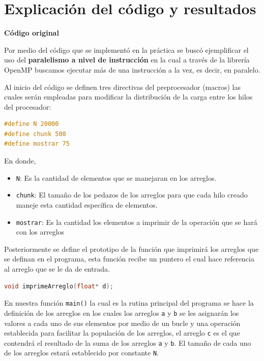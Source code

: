 \documentclass[12pt,a4paper]{article}
\begin{document}
\section{Explicación del código y resultados}

\textbf{Código original}

\vspace{1em}

Por medio del código que se implementó en la práctica se buscó ejemplificar el uso del \textbf{paralelismo a nivel de instrucción} en la cual a través de la librería OpenMP buscamos ejecutar más de una instrucción a la vez, es decir, en paralelo.

\vspace{1em}

Al inicio del código se definen tres directivas del preprocesador (macros) las cuales serán empleadas para modificar la distribución de la carga entre los hilos del procesador:

\begin{lstlisting}[language=C, numbers=none]
#define N 20000
#define chunk 500
#define mostrar 75
\end{lstlisting}
En donde,
\begin{itemize}
    \item \texttt{N}: Es la cantidad de elementos que se manejaran en los arreglos.
    \item \texttt{chunk}: El tamaño de los pedazos de los arreglos para que cada hilo creado maneje esta cantidad específica de elementos.
    \item \texttt{mostrar}: Es la cantidad los elementos a imprimir de la operación que se hará con los arreglos
\end{itemize}

Posteriormente se define el prototipo de la función que imprimirá los arreglos que se definan en el programa, esta función recibe un puntero el cual hace referencia al arreglo que se le da de entrada.

\begin{lstlisting}[language=C, numbers=none]
void imprimeArreglo(float* d);
\end{lstlisting}

\vspace{1em}

En nuestra función \texttt{main()} la cual es la rutina principal del programa se hace la definición de los arreglos en los cuales los arreglos \texttt{a} y \texttt{b} se les asignarán los valores a cada uno de sus elementos por medio de un bucle y una operación establecida para facilitar la populación de los arreglos, el arreglo \texttt{c} es el que contendrá el resultado de la suma de los arreglos \texttt{a} y \texttt{b}. El tamaño de cada uno de los arreglos estará establecido por constante \texttt{N}.
\end{document}
